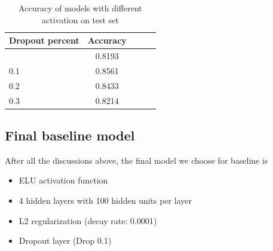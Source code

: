 \documentclass{article}
\begin{document}

\begin{table}[tb]
\vskip 3mm
\begin{center}
\begin{small}
\begin{sc}
\begin{tabular}{lcccr}
\hline
\abovespace\belowspace
Dropout percent & Accuracy \\
\hline
\abovespace
0.0    	& 0.8193 	\\
0.1 	& 0.8561 	\\
0.2  	& 0.8433 	\\
0.3		& 0.8214	\\

\hline
\end{tabular}
\end{sc}
\end{small}
\caption{Accuracy of models with different activation on test set}
\label{tab:dropout}
\end{center}
\vskip -3mm
\end{table}






\subsection{Final baseline model}
After all the discussions above, the final model we choose for baseline is
\begin{itemize}
	\item ELU activation function
	\item 4 hidden layers with 100 hidden units per layer
	\item L2 regularization (decay rate: 0.0001)
	\item Dropout layer (Drop 0.1)
\end{itemize}
\end{document}
